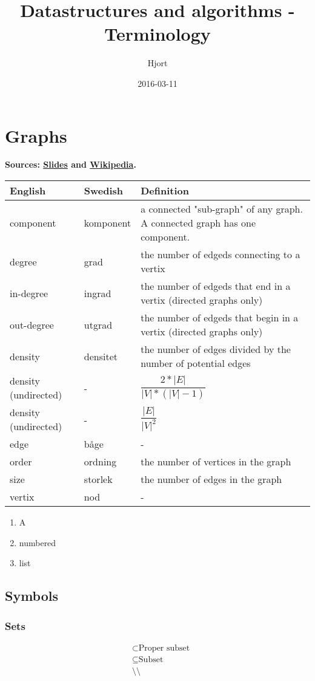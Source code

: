 \documentclass{article}
\title{Datastructures and algorithms - Terminology}
\date{2016-03-11}
\author{Hjort}
\begin{document}
\maketitle

\section{Graphs}

\textbf{Sources: \href{http://www.cse.chalmers.se/edu/course/tda416/mtrl/lectures/F9.pdf}{Slides} and \href{https://en.wikipedia.org/wiki/Glossary_of_graph_theory}{Wikipedia}.}

\begin{tabular}{l || l || p{5cm}}

    English & Swedish & Definition \\ \hline\hline
    component & komponent & a connected "sub-graph" of any graph. A connected graph has one component. \\\hline
    degree & grad & the number of edgeds connecting to a vertix \\\hline
    in-degree & ingrad & the number of edgeds that end in a vertix (directed graphs only)\\\hline
    out-degree & utgrad & the number of edgeds that begin in a vertix (directed graphs only)\\\hline
    density & densitet & the number of edges divided by the number of potential edges \\\hline
    density (undirected) & - & $\dfrac{ 2 * \lvert E\rvert }{ \lvert V\rvert * (\lvert V\rvert - 1)}$ \\\hline
    density (undirected) & - & $\dfrac{ \lvert E\rvert }{ \lvert V\rvert ^2}$ \\\hline
    edge & båge & - \\\hline
    order & ordning & the number of vertices in the graph \\\hline
    size & storlek & the number of edges in the graph \\\hline
    vertix & nod & - \\\hline
    
\end{tabular}

\begin{enumerate}
    \item A
    \item numbered
    \item list
\end{enumerate}

\subsection{Symbols}

\subsubsection{Sets}

\begin{align*}
    & \subset \text{Proper subset} \\
    & \subseteq \text{Subset} \\
    & \setminus \text{\textbackslash} \\
\end{align*}

 


\end{document}
